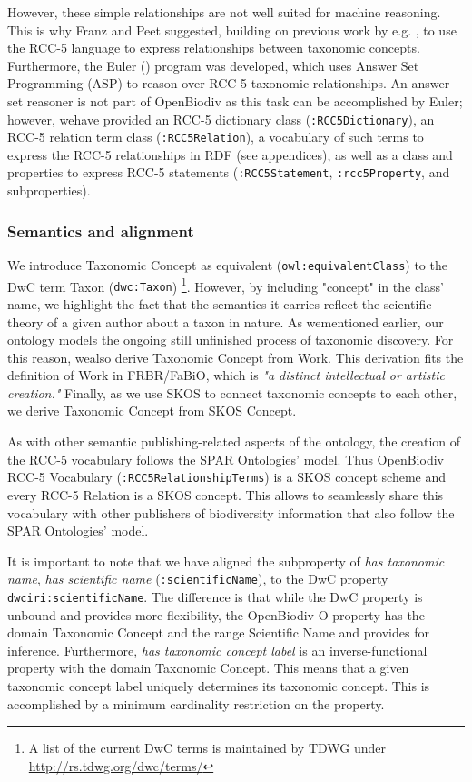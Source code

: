 However, these simple relationships are not well suited for machine reasoning. This is why Franz and Peet \cite{franz_perspectives:_2009} suggested, building on previous work by e.g. \cite{koperski_referenzliste_2000}, to use the RCC-5 language to express relationships between taxonomic concepts. Furthermore, the Euler (\cite{chen_euler/x:_2014}) program was developed, which uses Answer Set Programming (ASP) to reason over RCC-5 taxonomic relationships. An answer set reasoner is not part of  OpenBiodiv as this task can be accomplished by Euler; however, wehave provided an RCC-5 dictionary class ({\tt :RCC5Dictionary}), an RCC-5 relation term class ({\tt :RCC5Relation}), a vocabulary of such terms to express the RCC-5 relationships in RDF (see appendices), as well as a class and properties to express RCC-5 statements ({\tt :RCC5Statement}, {\tt :rcc5Property}, and subproperties). 

\subsubsection{Semantics and alignment}

We introduce Taxonomic Concept as equivalent ({\tt owl:equivalentClass}) to the DwC term Taxon ({\tt dwc:Taxon}) \footnote{A list of the current DwC terms is maintained by TDWG under \url{http://rs.tdwg.org/dwc/terms/}}. However, by including "concept" in the class' name, we highlight the fact that the semantics it carries reflect the scientific theory of a given author about a taxon in nature. As wementioned earlier, our ontology models the ongoing still unfinished process of taxonomic discovery. For this reason, wealso derive Taxonomic Concept from Work. This derivation fits the definition of Work in FRBR/FaBiO, which is \emph{"a distinct intellectual or artistic creation."} Finally, as we use SKOS to connect taxonomic concepts to each other, we derive Taxonomic Concept from SKOS Concept.

As with other semantic publishing-related aspects of the ontology, the creation of the RCC-5 vocabulary follows the SPAR Ontologies' model. Thus OpenBiodiv RCC-5 Vocabulary ({\tt :RCC5RelationshipTerms}) is a SKOS concept scheme and every RCC-5 Relation is a SKOS concept. This allows to seamlessly share this vocabulary with other publishers of biodiversity information that also follow the SPAR Ontologies' model.

It is important to note that we have aligned the subproperty of \emph{has taxonomic name}, \emph{has scientific name} ({\tt :scientificName}), to the DwC property {\tt dwciri:scientificName}. The difference is that while the DwC property is unbound and provides more flexibility, the \mbox{OpenBiodiv-O} property has the domain Taxonomic Concept and the range Scientific Name and provides for inference. Furthermore, \emph{has taxonomic concept label} is an inverse-functional property with the domain Taxonomic Concept. This means that a given taxonomic concept label uniquely determines its taxonomic concept. This is accomplished by a minimum cardinality restriction on the property.

